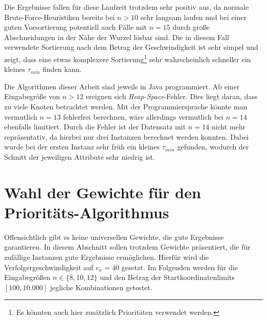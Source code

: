 \documentclass[german,version-2019-11]{uzl-thesis}
\begin{document}
Die Ergebnisse fallen für diese Laufzeit trotzdem sehr positiv aus, da normale Brute-Force-Heuristiken bereits bei $n>10$ sehr langsam laufen und bei einer guten Vorsortierung potentiell auch Fälle mit $n=15$ durch große Abschneidungen in der Nähe der Wurzel lösbar sind. Die in diesem Fall verwendete Sortierung nach dem Betrag der Geschwindigkeit ist sehr simpel und zeigt, dass eine etwas komplexere Sortierung\footnote{Es könnten auch hier zusätzlich Prioritäten verwendet werden.} sehr wahrscheinlich schneller ein kleines $\tau_{min}$ finden kann. 

Die Algorithmen dieser Arbeit sind jeweils in Java programmiert. Ab einer Eingabegröße von $n>12$ ereignen sich \emph{Heap-Space}-Fehler. Dies liegt daran, dass zu viele Knoten betrachtet werden. Mit der Programmiersprache könnte man vermutlich $n=13$ fehlerfrei berechnen, wäre allerdings vermutlich bei $n=14$ ebenfalls limitiert. Durch die Fehler ist der Datensatz mit $n=14$ nicht mehr repräsentativ, da hierbei nur drei Instanzen berechnet werden konnten. Dabei wurde bei der ersten Instanz sehr früh ein kleines $\tau_{min}$ gefunden, wodurch der Schnitt der jeweiligen Attribute sehr niedrig ist.   

\section{Wahl der Gewichte für den Prioritäts-Algorithmus}

Offensichtlich gibt es keine universellen Gewichte, die gute Ergebnisse garantieren. In diesem Abschnitt sollen trotzdem Gewichte präsentiert, die für zufällige Instanzen gute Ergebnisse ermöglichen. Hierfür wird die Verfolgergeschwindigkeit auf $v_{\kappa}=40$ gesetzt. Im Folgenden  werden für die Eingabegrößen $n\in\{8,10,12\}$ und den Betrag der Startkoordinatenlimits $[100,10.000]$ jegliche Kombinationen getestet. 
\begin{table}[htpb]
\centering
{}
\caption{Der jeweils beste Gewichte-Kandidat von $1.000$ zufälligen Gewichten für $100$ zufällige Instanzen.}
\label{tab:ExpGewichte}
\end{table} 
\end{document}
